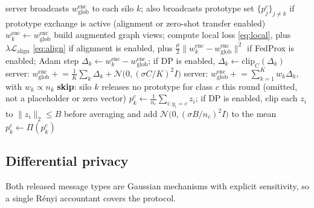 \documentclass[journal]{IEEEtran}
\begin{document}
\begin{algorithm}[!t]
\caption{One FedGNN round: local training, encoder aggregation, and
(if enabled) DP noise and prototype exchange.}
\label{alg:round}
\begin{algorithmic}[1]
\STATE server broadcasts $w^{\mathrm{enc}}_{\mathrm{glob}}$ to each
silo $k$; also broadcasts prototype set $\{p_j^c\}_{j \ne k}$ if
prototype exchange is active (alignment or zero-shot transfer enabled)
  \STATE $w_k^{\mathrm{enc}} \leftarrow w^{\mathrm{enc}}_{\mathrm{glob}}$
    \STATE build augmented graph views; compute local loss
      \eqref{eq:local}, plus $\lambda\mathcal{L}_{\mathrm{align}}$
      \eqref{eq:align} if alignment is enabled, plus
      $\tfrac{\mu}{2}\lVert w_k^{\mathrm{enc}} -
      w^{\mathrm{enc}}_{\mathrm{glob}}\rVert^{2}$ if FedProx is
      enabled; Adam step
  \ENDFOR
  \STATE $\Delta_k \leftarrow w_k^{\mathrm{enc}} -
    w^{\mathrm{enc}}_{\mathrm{glob}}$; if DP is enabled,
    $\Delta_k \leftarrow \mathrm{clip}_{C}(\Delta_k)$
\ENDFOR
{}
  \STATE server: $w^{\mathrm{enc}}_{\mathrm{glob}} \mathrel{+}=
  \tfrac{1}{K}\sum_k \Delta_k +
  \mathcal{N}\!\big(0, (\sigma C / K)^{2} I\big)$
\ELSE
  \STATE server: $w^{\mathrm{enc}}_{\mathrm{glob}} \mathrel{+}=
  \sum_{k=1}^{K} w_k \Delta_k$, with $w_k \propto n_k$
\ENDIF
{}
      \STATE \textbf{skip}: silo $k$ releases no prototype for class
      $c$ this round (omitted, not a placeholder or zero vector)
    \ELSE
      \STATE $p_k^{c} \leftarrow \tfrac{1}{n_c}\sum_{i: y_i = c} z_i$; if
      DP is enabled, clip each $z_i$ to $\lVert z_i\rVert_2 \le B$ before
      averaging and add $\mathcal{N}\big(0,(\sigma B/n_c)^2 I\big)$ to
      the mean
      \STATE $p_k^{c} \leftarrow \Pi(p_k^{c})$
    \ENDIF
  \ENDFOR
\ENDIF
\end{algorithmic}
\end{algorithm}

\subsection{Differential privacy}
\label{sec:dp}
Both released message types are Gaussian mechanisms with explicit
sensitivity, so a single R\'enyi accountant covers the protocol.
\end{document}

